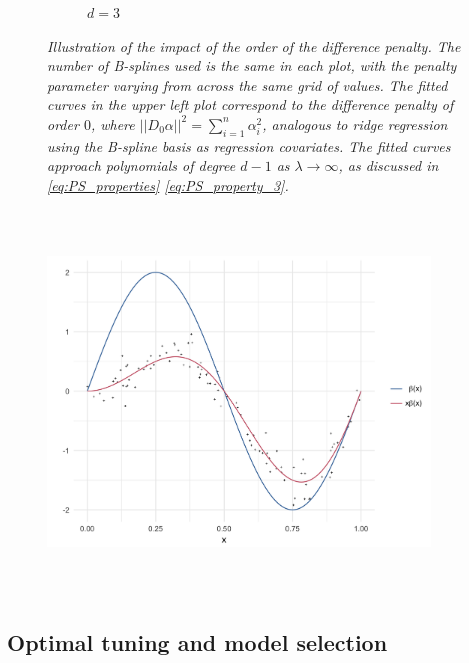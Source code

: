 \documentclass[12pt]{article}
\theoremstyle{definition}
\begin{document}
\begin{figure}[H]
\begin{subfigure}{.5\textwidth}
\caption{$d=3$}
\end{subfigure}
\caption{\textit{Illustration of the impact of the order of the difference penalty. The number of B-splines used is the same in each plot, with the penalty parameter varying from across the same grid of values. The fitted curves in the upper left plot correspond to the difference penalty of order $0$, where $\vert \vert D_0 \alpha \vert \vert^2 = \sum_{i=1}^n \alpha_i^2$, analogous to ridge regression using the B-spline basis as regression covariates. The fitted curves approach polynomials of degree $d-1$ as $\lambda \rightarrow \infty$, as discussed in \ref{eq:PS_properties} \ref{eq:PS_property_3}.}}
\label{fig:PS_penalty_section_figure_6}
\end{figure}




\begin{figure}[h]
\centering
 \graphicspath{{img/}}
  \includegraphics[width=4in, height=4in]{PS_penalty_section_figure_5.png}
\end{figure}




\subsection{Optimal tuning and model selection} \label{1D_model_selection_section}
\end{document}
